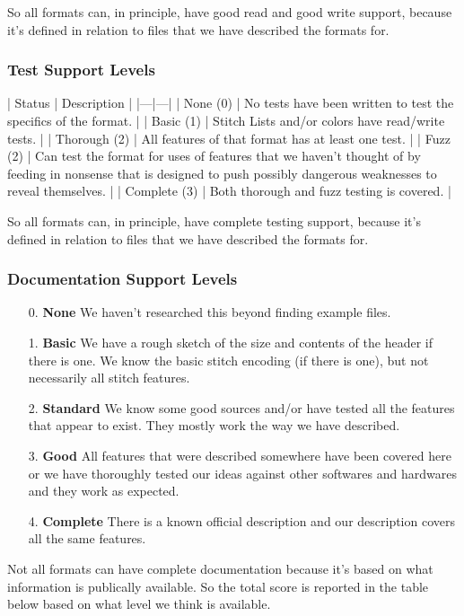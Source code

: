 \documentclass[a4paper, 11pt]{report}
\begin{document}
So all formats can, in principle, have good read and good write support, because it's defined in relation to files that we have described the formats for.

\subsubsection{Test Support Levels}

| Status | Description |
|---|---|
| None (0) | No tests have been written to test the specifics of the format. |
| Basic (1) | Stitch Lists and/or colors have read/write tests. |
| Thorough (2) | All features of that format has at least one test. |
| Fuzz (2) | Can test the format for uses of features that we haven't thought of by feeding in nonsense that is designed to push possibly dangerous weaknesses to reveal themselves. |
| Complete (3) | Both thorough and fuzz testing is covered. |

So all formats can, in principle, have complete testing support, because it's defined in relation to files that we have described the formats for.

\subsubsection{Documentation Support Levels}

\begin{enumerate}
\item[0.] \textbf{None} We haven't researched this beyond finding example files.
\item[1.] \textbf{Basic} We have a rough sketch of the size and contents of the header if there is one. We know the basic stitch encoding (if there is one), but not necessarily all stitch features. 
\item[2.] \textbf{Standard} We know some good sources and/or have tested all the features that appear to exist. They mostly work the way we have described.
\item[3.] \textbf{Good} All features that were described somewhere have been covered here or we have thoroughly tested our ideas against other softwares and hardwares and they work as expected. 
\item[4.] \textbf{Complete} There is a known official description and our description covers all the same features.
\end{enumerate}

Not all formats can have complete documentation because it's based on what 
information is publically available. So the total score is reported in the table
below based on what level we think is available.
\end{document}
